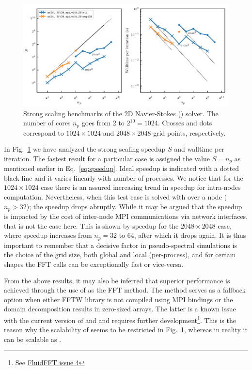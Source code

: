 \documentclass{../jors}
\begin{document}
\begin{figure}[htp]
\centering
\includegraphics[width=\linewidth]{tmp/fig_bench_strong2d}
\caption{Strong scaling benchmarks of the 2D Navier-Stokes
() solver. The number of cores $n_p$ goes from 2
to $2^{10} = 1024$. Crosses and dots correspond to $1024\times1024$ and
$2048\times2048$ grid points, respectively.}
\label{fig:strong2d}
\end{figure}

In Fig.~\ref{fig:strong2d} we have analyzed the strong scaling speedup $S$ and
walltime per iteration. The fastest result for a particular case is assigned
the value $S=n_p$ as mentioned earlier in Eq.~\ref{eq:speedup}. Ideal speedup
is indicated with a dotted black line and it varies linearly with number of
processes.  We notice that for the $1024\times1024$ case there is an assured
increasing trend in speedup for intra-nodes computation.
%
Nevertheless, when this test case is solved with over a node ($n_p > 32$); the
speedup drops abruptly. While it may be argued that the speedup is impacted by
the cost of inter-node MPI communications via network interfaces, that is not
the case here. This is shown by speedup for the $2048\times2048$ case, where
speedup increases from $n_p = 32$ to $64$, after which it drops again. It is thus
important to remember that a decisive factor in pseudo-spectral simulations is
the choice of the grid size, both global and local (per-process), and for certain
shapes the FFT calls can be exceptionally fast or vice-versa.

%

From the above results, it may also be inferred that superior performance is
achieved through the use of  as the FFT
method. The  method serves as a fallback
option when either FFTW library is not compiled using MPI bindings or the
domain decomposition results in zero-sized arrays. The latter is a known issue
with the current version of  and  and requires
further development\footnote{See
  \href{https://bitbucket.org/fluiddyn/fluidfft/issues/4}{FluidFFT issue 4}}.
This is the reason why the scalability of
 seems to be restricted
in Fig.~\ref{fig:strong2d}, whereas in reality it can be scalable as
.
\end{document}
